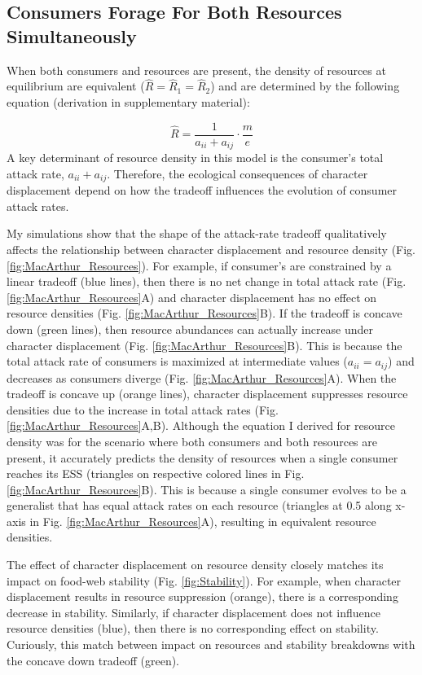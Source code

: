 \documentclass[11pt,]{article}
\begin{document}
\subsection{Consumers Forage For Both Resources
Simultaneously}\label{consumers-forage-for-both-resources-simultaneously}

When both consumers and resources are present, the density of resources
at equilibrium are equivalent (\(\hat R = \hat R_1 = \hat R_2\)) and are
determined by the following equation (derivation in supplementary
material):

\[\hat{R}=\frac{1}{a_{ii}+a_{ij}}\cdot\frac{m}{e}\] A key determinant of
resource density in this model is the consumer's total attack rate,
\(a_{ii}+a_{ij}\). Therefore, the ecological consequences of character
displacement depend on how the tradeoff influences the evolution of
consumer attack rates.

My simulations show that the shape of the attack-rate tradeoff
qualitatively affects the relationship between character displacement
and resource density (Fig. \ref{fig:MacArthur_Resources}). For example,
if consumer's are constrained by a linear tradeoff (blue lines), then
there is no net change in total attack rate (Fig.
\ref{fig:MacArthur_Resources}A) and character displacement has no effect
on resource densities (Fig. \ref{fig:MacArthur_Resources}B). If the
tradeoff is concave down (green lines), then resource abundances can
actually increase under character displacement (Fig.
\ref{fig:MacArthur_Resources}B). This is because the total attack rate
of consumers is maximized at intermediate values (\(a_{ii}=a_{ij}\)) and
decreases as consumers diverge (Fig. \ref{fig:MacArthur_Resources}A).
When the tradeoff is concave up (orange lines), character displacement
suppresses resource densities due to the increase in total attack rates
(Fig. \ref{fig:MacArthur_Resources}A,B). Although the equation I derived
for resource density was for the scenario where both consumers and both
resources are present, it accurately predicts the density of resources
when a single consumer reaches its ESS (triangles on respective colored
lines in Fig. \ref{fig:MacArthur_Resources}B). This is because a single
consumer evolves to be a generalist that has equal attack rates on each
resource (triangles at 0.5 along x-axis in Fig.
\ref{fig:MacArthur_Resources}A), resulting in equivalent resource
densities.

The effect of character displacement on resource density closely matches
its impact on food-web stability (Fig. \ref{fig:Stability}). For
example, when character displacement results in resource suppression
(orange), there is a corresponding decrease in stability. Similarly, if
character displacement does not influence resource densities (blue),
then there is no corresponding effect on stability. Curiously, this
match between impact on resources and stability breakdowns with the
concave down tradeoff (green).
\end{document}
